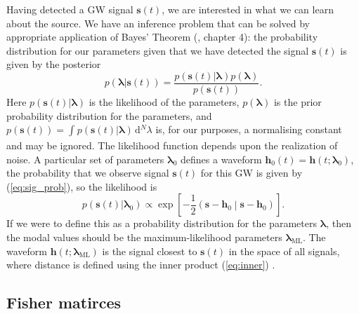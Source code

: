 \documentclass[useAMS,usedcolumn,usegraphicx,usenatbib]{mn2e}
\newcommand{\eqnref}[1]{(\ref{eq:#1})}
\newcommand{\sub}[1]{\ensuremath{_\mathrm{#1}}}
\newcommand{\dd}{\ensuremath{\mathrm{d}}}
\newcommand{\intd}[4]{\ensuremath{\int_{#1}^{#2}{#3}\,\dd{#4}}}
\newcommand{\recip}[1]{\ensuremath{\frac{1}{#1}}}
\newcommand{\innerprod}[2]{\ensuremath{\left({#1}\middle|{#2}\right)}}
\begin{document}
Having detected a GW signal $\boldsymbol{s}(t)$, we are interested in what we can learn about the source. We have an inference problem that can be solved by appropriate application of Bayes' Theorem (\citealt{Jaynes2003}, chapter 4): the probability distribution for our parameters given that we have detected the signal $\boldsymbol{s}(t)$ is given by the posterior
\begin{equation}
p(\boldsymbol{\lambda}|\boldsymbol{s}(t)) = \frac{p(\boldsymbol{s}(t)|\boldsymbol{\lambda})p(\boldsymbol{\lambda})}{p(\boldsymbol{s}(t))}.
\end{equation}
Here $p(\boldsymbol{s}(t)|\boldsymbol{\lambda})$ is the likelihood of the parameters, $p(\boldsymbol{\lambda})$ is the prior probability distribution for the parameters, and $p(\boldsymbol{s}(t)) = \intd{}{}{p(\boldsymbol{s}(t)|\boldsymbol{\lambda})}{^N \lambda}$ is, for our purposes, a normalising constant and may be ignored. The likelihood function depends upon the realization of noise. A particular set of parameters $\boldsymbol{\lambda}_0$ defines a waveform $\boldsymbol{h}_0(t) = \boldsymbol{h}(t; \boldsymbol{\lambda}_0)$, the probability that we observe signal $\boldsymbol{s}(t)$ for this GW is given by \eqnref{sig_prob}, so the likelihood is
\begin{equation}
p(\boldsymbol{s}(t)|\boldsymbol{\lambda}_0) \propto \exp\left[-\recip{2}\innerprod{\boldsymbol{s}-\boldsymbol{h}_0}{\boldsymbol{s}-\boldsymbol{h}_0}\right].
\label{eq:likelihood}
\end{equation}
If we were to define this as a probability distribution for the parameters $\boldsymbol{\lambda}$, then the modal values should be the maximum-likelihood parameters $\boldsymbol{\lambda}\sub{ML}$. The waveform $\boldsymbol{h}(t; \boldsymbol{\lambda}\sub{ML})$ is the signal closest to $\boldsymbol{s}(t)$ in the space of all signals, where distance is defined using the inner product \eqnref{inner} \citep{Cutler1994}.

\subsection{Fisher matirces}
\end{document}
